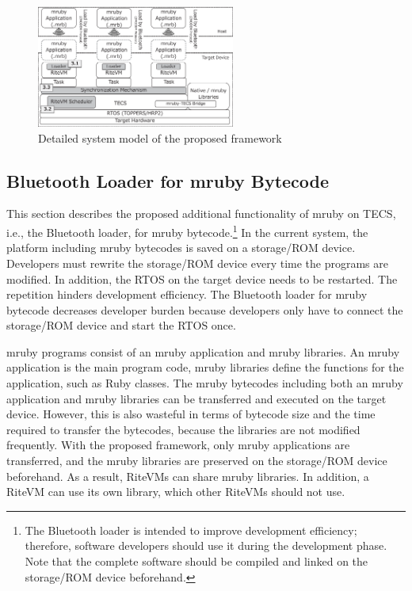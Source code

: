 \documentclass[S,R,E]{article/compsoft}
\begin{document}
\begin{figure}[t]
    \centering
    \includegraphics[width=6.5cm,clip]{figure/system_model.eps}
\caption{Detailed system model of the proposed framework}
\label{fig:system_model}
\end{figure}

\subsection{Bluetooth Loader for mruby Bytecode}
\label{sec:Bluetooth loader for mruby bytecode}
This section describes the proposed additional functionality of mruby on TECS, i.e., the Bluetooth loader, for mruby bytecode.\footnote{
The Bluetooth loader is intended to improve development efficiency; therefore, software developers should use it during the development phase.
Note that the complete software should be compiled and linked on the storage/ROM device beforehand.
}
In the current system, the platform including mruby bytecodes is saved on a storage/ROM device.
Developers must rewrite the storage/ROM device every time the programs are modified.
In addition, the RTOS on the target device needs to be restarted.
The repetition hinders development efficiency.
The Bluetooth loader for mruby bytecode decreases developer burden because developers only have to connect the storage/ROM device and start the RTOS once. 

mruby programs consist of an mruby application and mruby libraries.
An mruby application is the main program code, mruby libraries define the functions for the application, such as Ruby classes. 
The mruby bytecodes including both an mruby application and mruby libraries can be transferred and executed on the target device.
However, this is also wasteful in terms of bytecode size and the time required to transfer the bytecodes, because the libraries are not modified frequently.
With the proposed framework, only mruby applications are transferred, and the mruby libraries are preserved on the storage/ROM device beforehand.
As a result, RiteVMs can share mruby libraries.
In addition, a RiteVM can use its own library, which other RiteVMs should not use.
\end{document}
